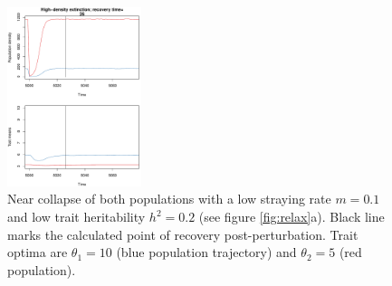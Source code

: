 \documentclass[twocolumn,preprintnumbers,amsmath,amssymb,superscriptaddress]{revtex4}
\begin{document}
\begin{figure}
  \captionsetup{justification=raggedright,
singlelinecheck=false
}
\centering
\includegraphics[width=0.35\textwidth]{figs2/fig_relax_both_lowh.pdf}
\caption{
Near collapse of both populations with a low straying rate $m=0.1$ and low trait heritability $h^2=0.2$ (see figure \ref{fig:relax}a).
Black line marks the calculated point of recovery post-perturbation.
Trait optima are $\theta_1 = 10$ (blue population trajectory) and $\theta_2 = 5$ (red population).
} \label{fig:relaxtraj_bothlh}
\end{figure}




\end{document}
